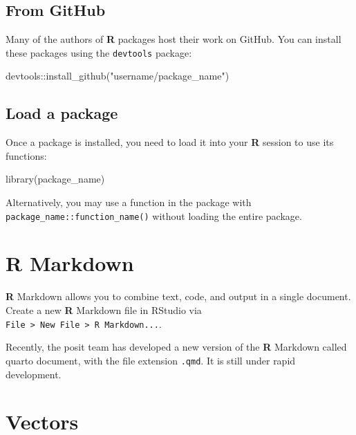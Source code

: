 \documentclass[
  letterpaper,
  DIV=11,
  numbers=noendperiod]{scrreprt}
\newenvironment{Shaded}{\begin{snugshade}}{\end{snugshade}}
\newcommand{\FunctionTok}[1]{\textcolor[rgb]{0.28,0.35,0.67}{#1}}
\newcommand{\NormalTok}[1]{\textcolor[rgb]{0.00,0.23,0.31}{#1}}
\newcommand{\SpecialCharTok}[1]{\textcolor[rgb]{0.37,0.37,0.37}{#1}}
\newcommand{\StringTok}[1]{\textcolor[rgb]{0.13,0.47,0.30}{#1}}
\begin{document}
\subsection{From GitHub}\label{from-github}

Many of the authors of \textbf{R} packages host their work on GitHub.
You can install these packages using the \texttt{devtools} package:

\begin{Shaded}
\begin{Highlighting}[]
\NormalTok{devtools}\SpecialCharTok{::}\FunctionTok{install\_github}\NormalTok{(}\StringTok{"username/package\_name"}\NormalTok{)}
\end{Highlighting}
\end{Shaded}

\subsection{Load a package}\label{load-a-package}

Once a package is installed, you need to load it into your \textbf{R}
session to use its functions:

\begin{Shaded}
\begin{Highlighting}[]
\FunctionTok{library}\NormalTok{(package\_name)}
\end{Highlighting}
\end{Shaded}

Alternatively, you may use a function in the package with
\texttt{package\_name::function\_name()} without loading the entire
package.

\section{R Markdown}\label{r-markdown}

\textbf{R} Markdown allows you to combine text, code, and output in a
single document. Create a new \textbf{R} Markdown file in RStudio via
\texttt{File\ \textgreater{}\ New\ File\ \textgreater{}\ R\ Markdown...}.

Recently, the posit team has developed a new version of the \textbf{R}
Markdown called quarto document, with the file extension \texttt{.qmd}.
It is still under rapid development.

\section{Vectors}\label{vectors}
\end{document}
